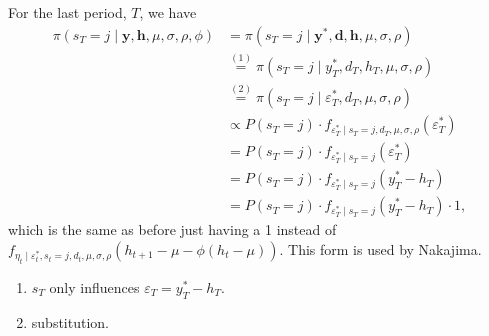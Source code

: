 \documentclass{article}
\begin{document}
For the last period, $T$, we have
\begin{align*}
\pi(s_T=j\mid\bm{y},\bm{h},\mu,\sigma,\rho,\phi)
&= \pi(s_T=j\mid\bm{y^*},\bm{d},\bm{h},\mu,\sigma,\rho) \\
&\overset{(1)}{=} \pi(s_T=j\mid y^*_T,d_T,h_T,\mu,\sigma,\rho) \\
&\overset{(2)}{=} \pi(s_T=j\mid \varepsilon^*_T,d_T,\mu,\sigma,\rho) \\
&\propto P(s_T=j)\cdot f_{\varepsilon^*_T\mid s_T=j,d_T,\mu,\sigma,\rho}(\varepsilon^*_T) \\
&= P(s_T=j)\cdot f_{\varepsilon^*_T\mid s_T=j}(\varepsilon^*_T) \\
&= P(s_T=j)\cdot f_{\varepsilon^*_T\mid s_T=j}(y^*_T-h_T) \\
&= P(s_T=j)\cdot f_{\varepsilon^*_T\mid s_T=j}(y^*_T-h_T)\cdot 1,
\end{align*}
which is the same as before just having a 1 instead of $f_{\eta_t\mid \varepsilon^*_t,s_t=j,d_t,\mu,\sigma,\rho}(h_{t+1}-\mu-\phi(h_t-\mu))$. This form is used by Nakajima.

\begin{enumerate}[(1)]
    \item $s_T$ only influences $\varepsilon_T=y^*_T-h_T$.
    \item substitution.
\end{enumerate}
\end{document}
